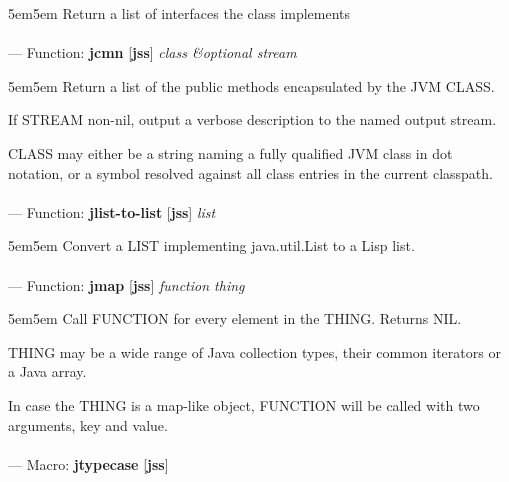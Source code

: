 \begin{adjustwidth}{5em}{5em}
Return a list of interfaces the class implements
\end{adjustwidth}

\paragraph{}
\label{JSS:JCMN}
--- Function: \textbf{jcmn} [\textbf{jss}] \textit{class \&optional stream}

\begin{adjustwidth}{5em}{5em}
Return a list of the public methods encapsulated by the JVM CLASS.

If STREAM non-nil, output a verbose description to the named output stream.

CLASS may either be a string naming a fully qualified JVM class in dot
notation, or a symbol resolved against all class entries in the
current classpath.
\end{adjustwidth}

\paragraph{}
\label{JSS:JLIST-TO-LIST}
--- Function: \textbf{jlist-to-list} [\textbf{jss}] \textit{list}

\begin{adjustwidth}{5em}{5em}
Convert a LIST implementing java.util.List to a Lisp list.
\end{adjustwidth}

\paragraph{}
\label{JSS:JMAP}
--- Function: \textbf{jmap} [\textbf{jss}] \textit{function thing}

\begin{adjustwidth}{5em}{5em}
Call FUNCTION for every element in the THING.  Returns NIL.

THING may be a wide range of Java collection types, their common iterators or
a Java array.

In case the THING is a map-like object, FUNCTION will be called with two
arguments, key and value.
\end{adjustwidth}

\paragraph{}
\label{JSS:JTYPECASE}
--- Macro: \textbf{jtypecase} [\textbf{jss}] \textit{}

